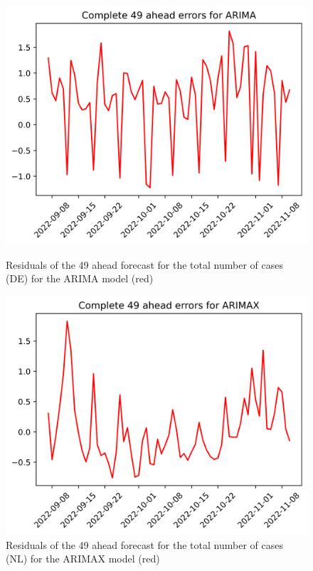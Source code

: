 \begin{figure}

\begin{minipage}{.32\textwidth}
  \centering
  \includegraphics[width=\linewidth]{pics/49_ah/DE_49_ahead_errors_ARIMA.png}
  \caption{Residuals of the 49 ahead forecast for the total number of cases (DE) for the ARIMA model (red)}
  \label{fig:tot_cases_error_49_ARIMA_DE}
\end{minipage}
\begin{minipage}{.32\textwidth}
  \centering
  \includegraphics[width=\linewidth]{pics/49_ah/49_ahead_errors_ARIMAX.png}
  \caption{Residuals of the 49 ahead forecast for the total number of cases (NL) for the ARIMAX model (red)}

\end{minipage}
\end{figure}
